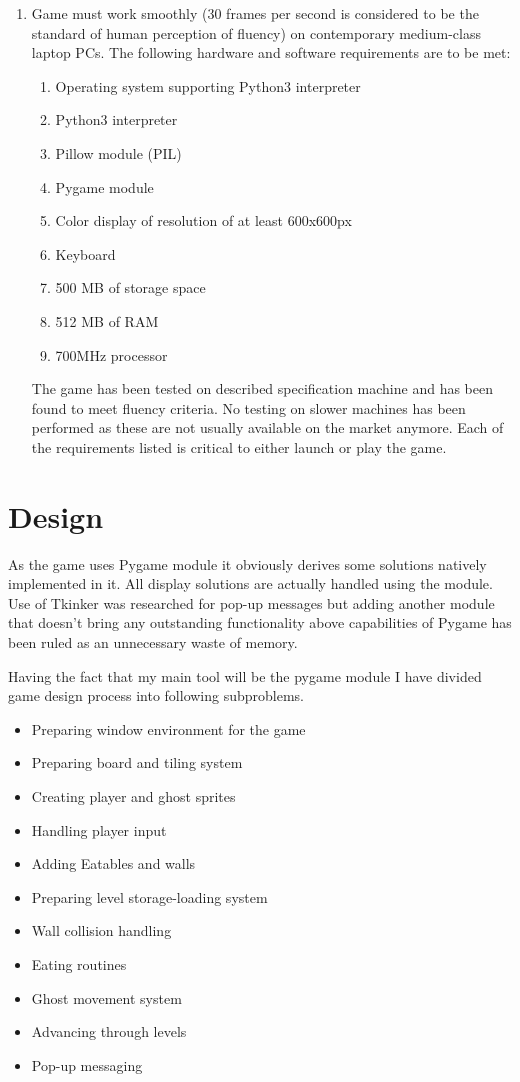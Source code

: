 \documentclass[11pt,a4paper,notitlepage]{report}
\begin{document}
\begin{enumerate}
\begin{enumerate}
					\end{enumerate} 
				\item
					Game must work smoothly (30 frames per second is considered to be the standard of human perception of fluency) on contemporary medium-class laptop PCs. The following hardware and software requirements are to be met:
					\begin{enumerate}
						\item
							Operating system supporting Python3 interpreter
						\item
							Python3 interpreter
						\item
							Pillow module (PIL)
						\item
							Pygame module
						\item
							Color display of resolution of at least 600x600px
						\item
							Keyboard
						\item
							500 MB of storage space
						\item
							512 MB of RAM
						\item
							700MHz processor
					\end{enumerate}
					The game has been tested on described specification machine and has been found to meet fluency criteria. No testing on slower machines has been performed as these are not usually available on the market anymore. Each of the requirements listed is critical to either launch or play the game.
			\end{enumerate}
			
	\chapter{Design}
		\newpage
		As the game uses Pygame module it obviously derives some solutions natively implemented in it. All display solutions are actually handled using the module. Use of Tkinker was researched for pop-up messages but adding another module that doesn't bring any outstanding functionality above capabilities of Pygame has been ruled as an unnecessary waste of memory.
		
		Having the fact that my main tool will be the pygame module I have divided game design process into following subproblems.
		\begin{itemize}
			\item
				Preparing window environment for the game
			\item
				Preparing board and tiling system
			\item
				Creating player and ghost sprites
			\item
				Handling player input
			\item
				Adding Eatables and walls
			\item
				Preparing level storage-loading system
			\item
				Wall collision handling
			\item
				Eating routines
			\item
				Ghost movement system
			\item
				Advancing through levels
			\item
				Pop-up messaging
		\end{itemize}
\end{document}
